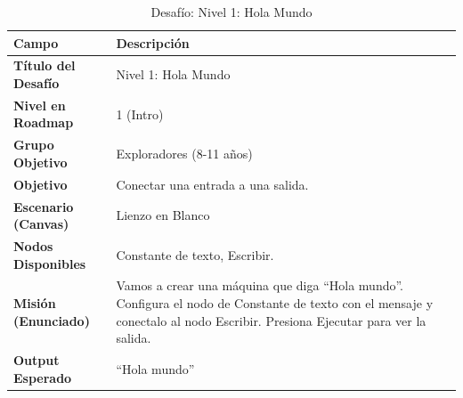 \label{apx:listado-desafios}

\begin{table}[H]
    \centering
    \caption{Desafío: Nivel 1: Hola Mundo}
    \label{tab:desafio-exp-1}
    \begingroup
    \renewcommand{\arraystretch}{\TableRowStretch}
    \begin{tabularx}{\textwidth}{ l X }
        \hline
        \textbf{Campo}              & \textbf{Descripción}                                                                                                                                                        \\
        \hline
        \textbf{Título del Desafío} & Nivel 1: Hola Mundo                                                                                                                                                         \\
        \textbf{Nivel en Roadmap}   & 1 (Intro)                                                                                                                                                                   \\
        \textbf{Grupo Objetivo}     & Exploradores (8-11 años)                                                                                                                                                    \\
        \textbf{Objetivo}           & Conectar una entrada a una salida.                                                                                                                                          \\
        \textbf{Escenario (Canvas)} & Lienzo en Blanco                                                                                                                                                            \\
        \textbf{Nodos Disponibles}  & Constante de texto, Escribir.                                                                                                                                               \\
        \textbf{Misión (Enunciado)} & Vamos a crear una máquina que diga “Hola mundo”. Configura el nodo de Constante de texto con el mensaje y conectalo al nodo Escribir. Presiona Ejecutar para ver la salida. \\
        \textbf{Output Esperado}    & “Hola mundo”                                                                                                                                                                \\
        \hline
    \end{tabularx}
    \endgroup
\end{table}

